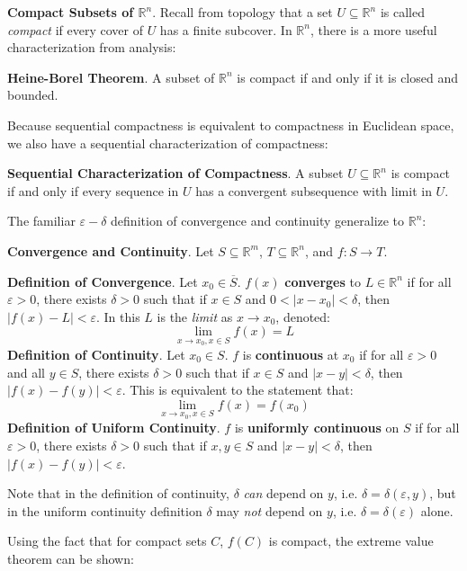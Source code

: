 \begin{framed}
    \textbf{Compact Subsets of $\mathbb{R}^n$}. Recall from topology that a set $U\subseteq\mathbb{R}^n$ is called \textit{compact} if every cover of $U$ has a finite subcover. In $\mathbb{R}^n$, there is a more useful characterization from analysis:

    \textbf{Heine-Borel Theorem}. A subset of $\mathbb{R}^n$ is compact if and only if it is closed and bounded.

    Because sequential compactness is equivalent to compactness in Euclidean space, we also have a sequential characterization of compactness:

    \textbf{Sequential Characterization of Compactness}. A subset $U\subseteq\mathbb{R}^n$ is compact if and only if every sequence in $U$ has a convergent subsequence with limit in $U$.
\end{framed}

\newpage
The familiar $\varepsilon-\delta$ definition of convergence and continuity generalize to $\mathbb{R}^n$:

\begin{framed}
\textbf{Convergence and Continuity}. Let $S\subseteq\mathbb{R}^m$, $T\subseteq \mathbb{R}^n$, and $f:S\to T$.

\textbf{Definition of Convergence}. Let $x_0\in\overline{S}$. $f(x)$ \textbf{converges} to $L\in\mathbb{R}^n$ if for all $\varepsilon>0$, there exists $\delta>0$ such that if $x\in S$ and $0<|x-x_0|<\delta$, then $|f(x)-L| < \varepsilon$. In this $L$ is the \textit{limit} as $x\to x_0$, denoted: \[\lim_{x\to x_0,x\in S} f(x) = L\] \textbf{Definition of Continuity}. Let $x_0\in S$. $f$ is \textbf{continuous} at $x_0$ if for all $\varepsilon>0$ and all $y\in S$, there exists $\delta>0$ such that if $x\in S$ and $|x-y|<\delta$, then $|f(x)-f(y)|<\varepsilon$. This is equivalent to the statement that: \[\lim_{x\to x_0,x\in S} f(x) = f(x_0)\] \textbf{Definition of Uniform Continuity}. $f$ is \textbf{uniformly continuous} on $S$ if for all $\varepsilon>0$, there exists $\delta>0$ such that if $x,y\in S$ and $|x-y|<\delta$, then $|f(x)-f(y)|<\varepsilon$.

Note that in the definition of continuity, $\delta$ \textit{can} depend on $y$, i.e. $\delta = \delta(\varepsilon,y)$, but in the uniform continuity definition $\delta$ may \textit{not} depend on $y$, i.e. $\delta = \delta(\varepsilon)$ alone.
\end{framed}

Using the fact that for compact sets $C$, $f(C)$ is compact, the extreme value theorem can be shown: 

